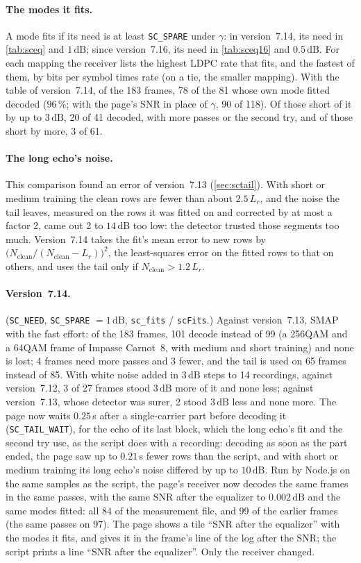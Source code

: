 \documentclass[11pt,a4paper]{article}
\newcommand{\dB}{\,\mathrm{dB}}
\newcommand{\code}[1]{\texttt{#1}}
\theoremstyle{remark}
\begin{document}
\paragraph{The modes it fits.} A mode fits if its need is at least \code{SC\_SPARE} under $\gamma$: in version~7.14, its need in \cref{tab:sceq} and $1\dB$; since version~7.16, its need in \cref{tab:sceq16} and $0.5\dB$. For each mapping the receiver lists the highest LDPC rate that fits, and the fastest of them, by bits per symbol times rate (on a tie, the smaller mapping). With the table of version~7.14, of the 183 frames, 78 of the 81 whose own mode fitted decoded ($96\,\%$; with the page's SNR in place of $\gamma$, 90 of 118). Of those short of it by up to $3\dB$, 20 of 41 decoded, with more passes or the second try, and of those short by more, 3 of 61.

\paragraph{The long echo's noise.} This comparison found an error of version~7.13 (\cref{sec:sctail}). With short or medium training the clean rows are fewer than about $2.5\,L_r$, and the noise the tail leaves, measured on the rows it was fitted on and corrected by at most a factor 2, came out 2 to $14\dB$ too low: the detector trusted those segments too much. Version~7.14 takes the fit's mean error to new rows by $\bigl(N_{\mathrm{clean}}/(N_{\mathrm{clean}} - L_r)\bigr)^2$, the least-squares error on the fitted rows to that on others, and uses the tail only if $N_{\mathrm{clean}} > 1.2\,L_r$.

\paragraph{Version~7.14.} (\code{SC\_NEED}, \code{SC\_SPARE} $= 1\dB$, \code{sc\_fits} / \code{scFits}.) Against version~7.13, SMAP with the fast effort: of the 183 frames, 101 decode instead of 99 (a 256QAM and a 64QAM frame of Impasse Carnot~8, with medium and short training) and none is lost; 4 frames need more passes and 3 fewer, and the tail is used on 65 frames instead of 85. With white noise added in $3\dB$ steps to 14 recordings, against version~7.12, 3 of 27 frames stood $3\dB$ more of it and none less; against version~7.13, whose detector was surer, 2 stood $3\dB$ less and none more. The page now waits $0.25$\,s after a single-carrier part before decoding it (\code{SC\_TAIL\_WAIT}), for the echo of its last block, which the long echo's fit and the second try use, as the script does with a recording: decoding as soon as the part ended, the page saw up to $0.21$\,s fewer rows than the script, and with short or medium training its long echo's noise differed by up to $10\dB$. Run by Node.js on the same samples as the script, the page's receiver now decodes the same frames in the same passes, with the same SNR after the equalizer to $0.002\dB$ and the same modes fitted: all 84 of the measurement file, and 99 of the earlier frames (the same passes on 97). The page shows a tile ``SNR after the equalizer'' with the modes it fits, and gives it in the frame's line of the log after the SNR; the script prints a line ``SNR after the equalizer''. Only the receiver changed.
\end{document}
